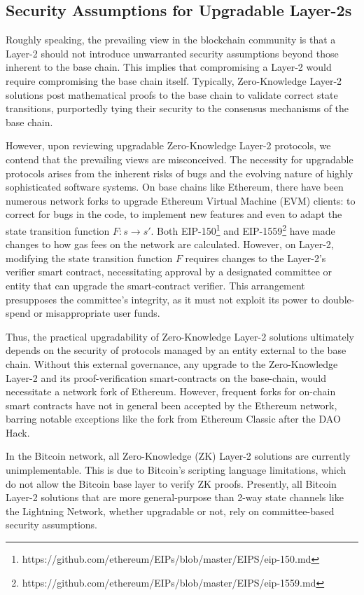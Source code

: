 \documentclass{article}
\begin{document}
\subsection{Security Assumptions for Upgradable Layer-2s} 

Roughly speaking, the prevailing view in the blockchain community is that a Layer-2 should not introduce unwarranted security assumptions beyond those inherent to the base chain. This implies that compromising a Layer-2 would require compromising the base chain itself. Typically, Zero-Knowledge Layer-2 solutions post mathematical proofs to the base chain to validate correct state transitions, purportedly tying their security to the consensus mechanisms of the base chain.

However, upon reviewing upgradable Zero-Knowledge Layer-2 protocols, we contend that the prevailing views are misconceived. The necessity for upgradable protocols arises from the inherent risks of bugs and the evolving nature of highly sophisticated software systems. On base chains like Ethereum, there have been numerous network forks to upgrade Ethereum Virtual Machine (EVM) clients: to correct for bugs in the code, to implement new features and even to adapt the state transition function $F: s \rightarrow s'$.  Both EIP-150\footnote{https://github.com/ethereum/EIPs/blob/master/EIPS/eip-150.md} and EIP-1559\footnote{https://github.com/ethereum/EIPs/blob/master/EIPS/eip-1559.md} have made changes to how gas fees on the network are calculated. However, on Layer-2, modifying the state transition function $F$ requires changes to the Layer-2's  verifier smart contract, necessitating approval by a designated committee or entity that can upgrade the smart-contract verifier. This arrangement presupposes the committee’s integrity, as it must not exploit its power to double-spend or misappropriate user funds.

Thus, the practical upgradability of Zero-Knowledge Layer-2 solutions ultimately depends on the security of protocols managed by an entity external to the base chain. Without this external governance, any upgrade to the Zero-Knowledge Layer-2 and its proof-verification smart-contracts on the base-chain, would necessitate a network fork of Ethereum. However, frequent forks for on-chain smart contracts have not in general been accepted by the Ethereum network, barring notable exceptions like the fork from Ethereum Classic after the DAO Hack.

In the Bitcoin network, all Zero-Knowledge (ZK) Layer-2 solutions are currently unimplementable. This is due to Bitcoin's scripting language limitations, which do not allow the Bitcoin base layer to verify ZK proofs. Presently, all Bitcoin Layer-2 solutions that are more general-purpose than 2-way state channels like the Lightning Network, whether upgradable or not,  rely on committee-based security assumptions.
\end{document}
